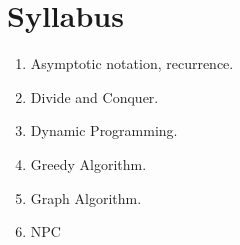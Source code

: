 \section{Syllabus}
\begin{enumerate}
\item Asymptotic  notation, recurrence.
\item Divide and Conquer.
\item Dynamic Programming.
\item Greedy Algorithm.
\item Graph Algorithm.
\item NPC
\end{enumerate}
